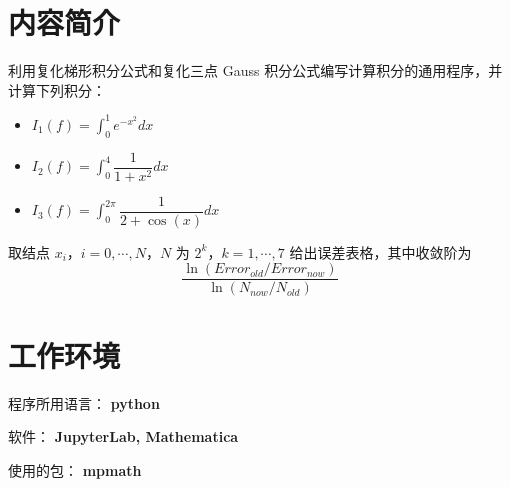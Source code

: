 \documentclass{ctexart}
\begin{document}
\section*{内容简介}
	\noindent 利用复化梯形积分公式和复化三点 Gauss 积分公式编写计算积分的通用程序，并计算下列积分：
	\begin{itemize}
		\item $ \displaystyle I_1(f) = \int_0^1 e^{−x^2} dx $
		\item $ \displaystyle I_2(f) = \int_0^4 \dfrac{1}{1 + x^2} dx $
		\item $ \displaystyle I_3(f) = \int_0^{2\pi} \dfrac{1}{2 + \cos(x)} dx $
	\end{itemize}
	取结点 $x_i$，$i = 0, \cdots, N$，$N$ 为 $2^k$，$k = 1, \cdots, 7$ 给出误差表格，其中收敛阶为 
	\begin{equation*}
		\dfrac{\ln(Error_{old} /Error_{now})}{\ln(N_{now} / N_{old})}
	\end{equation*}
	
\section*{工作环境}
	程序所用语言： {\bf python}
	
	软件： {\bf JupyterLab, Mathematica}
	
	使用的包： {\bf mpmath}\\
\end{document}
